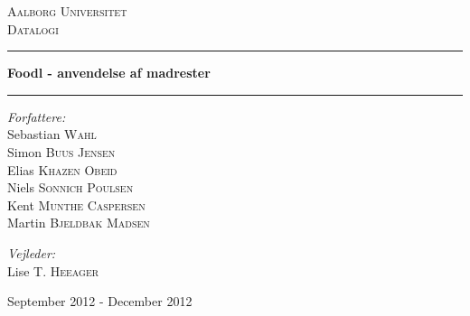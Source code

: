 \begin{titlingpage}
\centering
\vspace*{1.0cm}

\textsc{\LARGE Aalborg Universitet}\\[0.75cm]
\textsc{\Large Datalogi}\\[1.75cm]

\hrule
{ \huge \bfseries Foodl - anvendelse af madrester}
\vspace{0.5cm}
\hrule
\vspace{0.75cm}

  \begin{flushleft} \large
    \vspace{0pt}
    \emph{Forfattere:}\\
    Sebastian \textsc{Wahl}\\
    Simon \textsc{Buus Jensen}\\
    Elias \textsc{Khazen Obeid}\\
    Niels \textsc{Sonnich Poulsen}\\
    Kent \textsc{Munthe Caspersen}\\
    Martin \textsc{Bjeldbak Madsen}\\
  \end{flushleft}

  \begin{flushright} \large
  \vspace{-132pt}
  \emph{Vejleder:}\\
  Lise T. \textsc{Heeager}
  \end{flushright}


\vfill

{\large September 2012 - December 2012}

\end{titlingpage}
